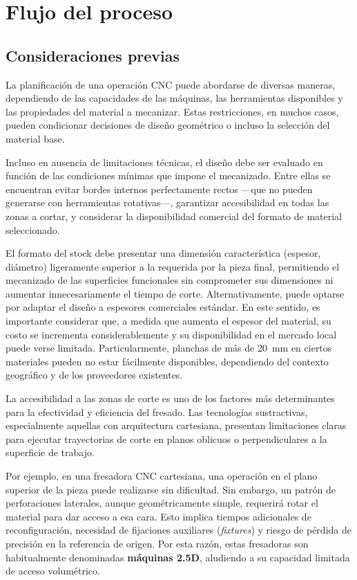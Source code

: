 \section{Flujo del proceso}

\subsection{Consideraciones previas}

La planificación de una operación CNC puede abordarse de diversas maneras, dependiendo de las capacidades de las máquinas, las herramientas disponibles y las propiedades del material a mecanizar. Estas restricciones, en muchos casos, pueden condicionar decisiones de diseño geométrico o incluso la selección del material base.

Incluso en ausencia de limitaciones técnicas, el diseño debe ser evaluado en función de las condiciones mínimas que impone el mecanizado. Entre ellas se encuentran evitar bordes internos perfectamente rectos —que no pueden generarse con herramientas rotativas—, garantizar accesibilidad en todas las zonas a cortar, y considerar la disponibilidad comercial del formato de material seleccionado.

El formato del stock debe presentar una dimensión característica (espesor, diámetro) ligeramente superior a la requerida por la pieza final, permitiendo el mecanizado de las superficies funcionales sin comprometer sus dimensiones ni aumentar innecesariamente el tiempo de corte. Alternativamente, puede optarse por adaptar el diseño a espesores comerciales estándar. En este sentido, es importante considerar que, a medida que aumenta el espesor del material, su costo se incrementa considerablemente y su disponibilidad en el mercado local puede verse limitada. Particularmente, planchas de más de 20~mm en ciertos materiales pueden no estar fácilmente disponibles, dependiendo del contexto geográfico y de los proveedores existentes.

La accesibilidad a las zonas de corte es uno de los factores más determinantes para la efectividad y eficiencia del fresado. Las tecnologías sustractivas, especialmente aquellas con arquitectura cartesiana, presentan limitaciones claras para ejecutar trayectorias de corte en planos oblicuos o perpendiculares a la superficie de trabajo.

Por ejemplo, en una fresadora CNC cartesiana, una operación en el plano superior de la pieza puede realizarse sin dificultad. Sin embargo, un patrón de perforaciones laterales, aunque geométricamente simple, requerirá rotar el material para dar acceso a esa cara. Esto implica tiempos adicionales de reconfiguración, necesidad de fijaciones auxiliares (\textit{fixtures}) y riesgo de pérdida de precisión en la referencia de origen. Por esta razón, estas fresadoras son habitualmente denominadas \textbf{máquinas 2.5D}, aludiendo a su capacidad limitada de acceso volumétrico.

